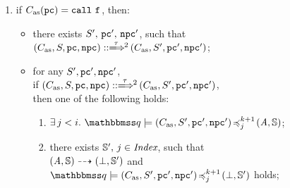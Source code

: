 \begin{definition}
\begin{enumerate}[1.]
        \item if $\asmimp(\pc) = \call \ \lab{}$, then:
            \begin{itemize}
                \item there exists $S', \, \texttt{pc}', \, \texttt{npc}'$, 
                 such that \\
                    $\LGlobMultiTrans{(\asmimp, \state, \pc, \npc)}
                        {\empmsg\,}{2}{(\asmimp, \state', \pc', \npc')}$; 
                \item for any $S', \texttt{pc}', \texttt{npc}'$, \\ if 
                $\LGlobMultiTrans{(\asmimp, \state, \pc, \npc)}{\empmsg\,}
                    {2}{(\asmimp, \state', \pc', \npc')}$, \\
                    then one of the following holds: 
                \begin{enumerate}
                    \item $\exists \, j < i. \ 
                        \simFunctionSt{\relastQ}{(\asmimp, \state', \pc', \npc')}
                            {j}{k+1}{(\primcom, \hpstate)}$; 
                    \item there exists $\mathbb{S}', \, j \in \textit{Index}$, 
                        such that \\
                        ${(\textit{A}, \mathbb{S})} \dashrightarrow {(\perp, \mathbb{S}')}$ 
                        and \\
                        $\simFunctionSt{\relastQ}{(\asmimp, \state', \pc', \npc')}
                            {j}{k+1}{(\primdone, \hpstate')}$ holds; 
                \end{enumerate}
            \end{itemize}
            \vspace{0.5em}
        

\end{enumerate}
\end{definition}
